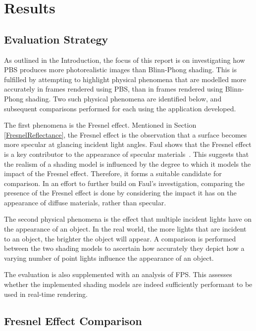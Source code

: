\chapter{Results}
\label{chapter3}

\section{Evaluation Strategy}

As outlined in the Introduction, the focus of this report is on investigating how PBS produces more photorealistic images than Blinn-Phong shading. This is fulfilled by attempting to highlight physical phenomena that are modelled more accurately in frames rendered using PBS, than in frames rendered using Blinn-Phong shading. Two such physical phenomena are identified below, and subsequent comparisons performed for each using the application developed.

The first phenomena is the Fresnel effect. Mentioned in Section \ref{FresnelReflectance}, the Fresnel effect is the observation that a surface becomes more specular at glancing incident light angles. Faul shows that the Fresnel effect is a key contributor to the appearance of specular materials~\cite{FaulInfluenceOfFresnelEffect}. This suggests that the realism of a shading model is influenced by the degree to which it models the impact of the Fresnel effect. Therefore, it forms a suitable candidate for comparison. In an effort to further build on Faul's investigation, comparing the presence of the Fresnel effect is done by considering the impact it has on the appearance of diffuse materials, rather than specular.

The second physical phenomena is the effect that multiple incident lights have on the appearance of an object. In the real world, the more lights that are incident to an object, the brighter the object will appear. A comparison is performed between the two shading models to ascertain how accurately they depict how a varying number of point lights influence the appearance of an object.

The evaluation is also supplemented with an analysis of FPS. This assesses whether the implemented shading models are indeed sufficiently performant to be used in real-time rendering.

\section{Fresnel Effect Comparison}

